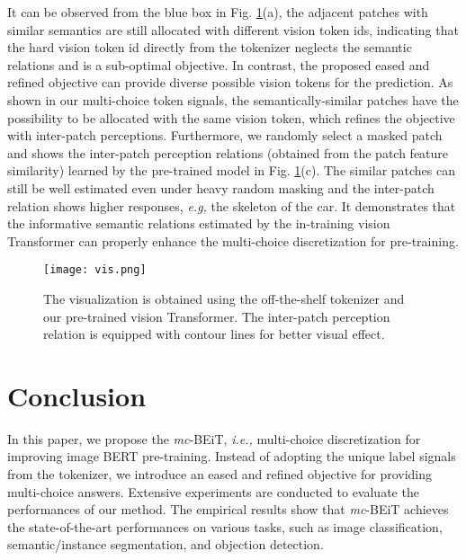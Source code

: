 \documentclass[runningheads]{llncs}
\begin{document}
It can be observed from the blue box in Fig. \ref{vis}(a), the adjacent patches with similar semantics are still allocated with different vision token ids, indicating that the hard vision token id directly from the tokenizer neglects the semantic relations and is a sub-optimal objective. In contrast, the proposed eased and refined objective can provide diverse possible vision tokens for the prediction. As shown in our multi-choice token signals, the semantically-similar patches have the possibility to be allocated with the same vision token, which refines the objective with inter-patch perceptions. Furthermore, we randomly select a masked patch and shows the inter-patch perception relations (obtained from the patch feature similarity) learned by the pre-trained model in Fig. \ref{vis}(c). 
The similar patches can still be well estimated even under heavy random masking and the inter-patch relation shows higher responses, \textit{e.g,} the skeleton of the car. 
It demonstrates that the informative semantic relations estimated by the in-training vision Transformer can properly enhance the multi-choice discretization for pre-training.






\begin{figure}[t]
\begin{center}
\texttt{[image: vis.png]}
\caption{The visualization is obtained using the off-the-shelf tokenizer and our pre-trained vision Transformer. The inter-patch perception relation is equipped with contour lines for better visual effect.}
\label{vis}
\end{center}
\end{figure}


\section{Conclusion}

In this paper, we propose the \emph{mc}-BEiT, \textit{i.e.,} multi-choice discretization for improving image BERT pre-training. Instead of adopting the unique label signals from the tokenizer, we introduce an eased and refined objective for providing multi-choice answers. Extensive experiments are conducted to evaluate the performances of our method. The empirical results show that \emph{mc}-BEiT achieves the state-of-the-art performances on various tasks, such as image classification, semantic/instance segmentation, and objection detection.
\end{document}
